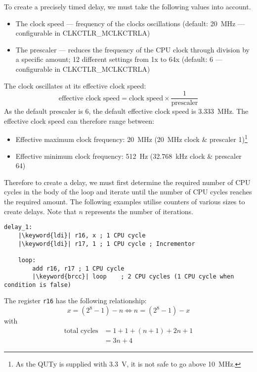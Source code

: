 \documentclass{article}
\newcommand{\keyword}[1]{\textcolor[rgb]{0.00,0.50,0.00}{\textbf{#1}}}
\begin{document}
To create a precisely timed delay, we must take the following values
into account.
\begin{itemize}
    \item The clock speed --- frequency of the clocks oscillations
          (default: \qty{20}{MHz} --- configurable in
          CLKCTLR\_MCLKCTRLA)
    \item The prescaler --- reduces the frequency of the CPU clock
          through division by a specific amount; 12 different settings
          from 1x to 64x (default: 6 --- configurable in
          CLKCTLR\_MCLKCTRLA)
\end{itemize}
The clock oscillates at its effective clock speed:
\begin{equation*}
    \text{effective clock speed} = \text{clock speed} \times \frac{1}{\text{prescaler}}
\end{equation*}
As the default prescaler is 6, the default effective clock speed is
\qty{3.333}{MHz}. The effective clock speed can therefore range between:
\begin{itemize}
    \item Effective maximum clock frequency: \qty{20}{MHz}
          (\qty{20}{MHz} clock \& prescaler 1)\footnote{As the QUTy is
          supplied with \qty{3.3}{V}, it is not safe to go above
          \qty{10}{MHz}.}
    \item Effective minimum clock frequency: \qty{512}{Hz}
          (\qty{32.768}{kHz} clock \& prescaler 64)
\end{itemize}
Therefore to create a delay, we must first determine the required number
of CPU cycles in the body of the loop and iterate until the number of
CPU cycles reaches the required amount. The following examples utilise
counters of various sizes to create delays. Note that \(n\) represents
the number of iterations.
\begin{verbatim}
delay_1:
    |\keyword{ldi}| r16, x ; 1 CPU cycle
    |\keyword{ldi}| r17, 1 ; 1 CPU cycle ; Incrementor

    loop:
        add r16, r17 ; 1 CPU cycle
        |\keyword{brcc}| loop    ; 2 CPU cycles (1 CPU cycle when condition is false)
\end{verbatim}
The register \texttt{r16} has the following relationship:
\begin{equation*}
    x = \left( 2^8 - 1 \right) - n \iff n = \left( 2^8 - 1 \right) - x
\end{equation*}
with
\begin{align*}
    \text{total cycles} & = 1 + 1 + \left( n + 1 \right) + 2 n + 1 \\
                        & = 3 n + 4
\end{align*}
\end{document}
